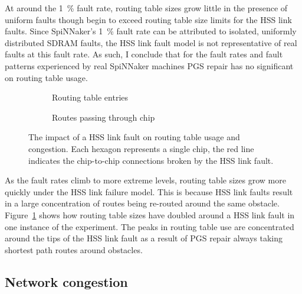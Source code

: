			At around the \SI{1}{\percent} fault rate, routing table sizes grow
			little in the presence of uniform faults though begin to exceed routing
			table size limits for the HSS link faults. Since SpiNNaker's
			\SI{1}{\percent} fault rate can be attributed to isolated, uniformly
			distributed SDRAM faults, the HSS link fault model is not representative
			of real faults at this fault rate. As such, I conclude that for the fault
			rates and fault patterns experienced by real SpiNNaker machines PGS
			repair has no significant on routing table usage.
			
			\begin{figure}
				\center
				\begin{subfigure}{0.48\linewidth}
					\center
					
					\caption{Routing table entries}
					\label{fig:hss-link-routing-table-usage}
				\end{subfigure}
				\begin{subfigure}{0.48\linewidth}
					\center
					
					\caption{Routes passing through chip}
					\label{fig:hss-link-resource-usage}
				\end{subfigure}
				
				\caption[The impact of a HSS link fault.]%
				{The impact of a HSS link fault on routing table usage and
				congestion. Each hexagon represents a single chip, the red line
				indicates the chip-to-chip connections broken by the HSS link fault.}
				\label{fig:hss-link-usage}
			\end{figure}
			
			As the fault rates climb to more extreme levels, routing table sizes grow
			more quickly under the HSS link failure model. This is because HSS link
			faults result in a large concentration of routes being re-routed around
			the same obstacle. Figure~\ref{fig:hss-link-routing-table-usage} shows
			how routing table sizes have doubled around a HSS link fault in one
			instance of the experiment. The peaks in routing table use are
			concentrated around the tips of the HSS link fault as a result of PGS
			repair always taking shortest path routes around obstacles.
		
		\subsection{Network congestion}
			
